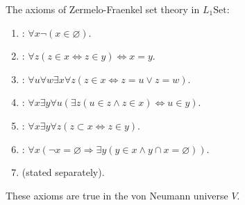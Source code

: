 The axioms of Zermelo-Fraenkel set theory in $L_1\mathrm{Set}$:
\begin{enumerate}
\item[(a)] : $\forall x \neg (x \in \varnothing)$.
\item[(b)] : $\forall z (z \in x \iff z \in y) \iff x = y$.
\item[(c)] : $\forall u \forall w \exists x \forall z (z \in x \iff z = u \vee z = w)$.
\item[(d)] : $\forall x \exists y \forall u (\exists z (u \in z \land z \in x) \iff u \in y)$.
\item[(e)] : $\forall x \exists y \forall z (z \subset x \iff z \in y)$.
\item[(f)] : $\forall x (\neg x = \varnothing \Rightarrow \exists y (y \in x \land y \cap x = \varnothing))$.
\item[(g)]  (stated separately).
\end{enumerate}
These axioms are true in the von Neumann universe $V$.
